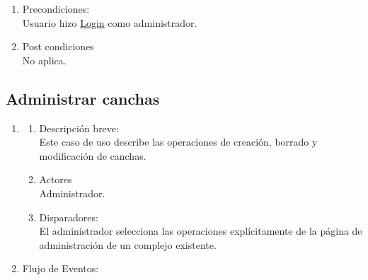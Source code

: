 \documentclass[a4paper,11pt]{article}
\begin{document}
\begin{enumerate}
    \item Precondiciones: \\
        Usuario hizo \underline{Login} como administrador.

    \item Post condiciones \\
        No aplica.

\end{enumerate}

\subsection{Administrar canchas}
\begin{enumerate}

    \item
    \begin{enumerate}
    \item Descripción breve: \\
        Este caso de uso describe las operaciones de creación, borrado y
        modificación de canchas.
    \item Actores \\
        Administrador.
    \item Disparadores: \\
        El administrador selecciona las operaciones explícitamente de la página
        de administración de un complejo existente.
    \end{enumerate}

    \item Flujo de Eventos: 

    \begin{enumerate}


\end{enumerate}
\end{enumerate}
\end{document}
